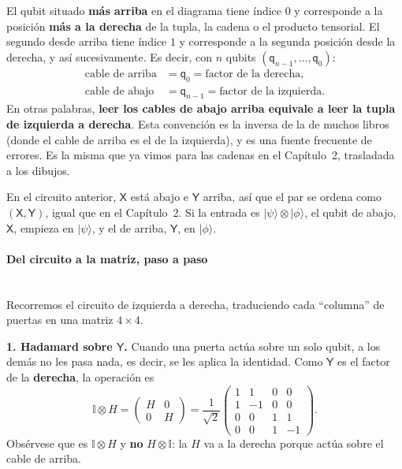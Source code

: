 \documentclass[11pt, a4paper, twoside, openright]{report}
\begin{document}
\begin{tcolorbox}[colback=teal!5!white,colframe=teal!75!black,title=\textbf{Convención de Qiskit para ordenar los qubits en un circuito}]
El qubit situado \textbf{más arriba} en el diagrama tiene índice $0$ y corresponde a la posición \textbf{más a la derecha} de la tupla, la cadena o el producto tensorial. El segundo desde arriba tiene índice $1$ y corresponde a la segunda posición desde la derecha, y así sucesivamente. Es decir, con $n$ qubits $(\mathsf{q}_{n-1},\dots,\mathsf{q}_0)$:
\begin{align*} \text{cable de arriba} &= \mathsf{q}_0 = \text{factor de la derecha}, \\ \text{cable de abajo} &= \mathsf{q}_{n-1} = \text{factor de la izquierda}. \end{align*}
En otras palabras, \textbf{leer los cables de abajo arriba equivale a leer la tupla de izquierda a derecha}. Esta convención es la inversa de la de muchos libros (donde el cable de arriba es el de la izquierda), y es una fuente frecuente de errores. Es la misma que ya vimos para las cadenas en el Capítulo~2, trasladada a los dibujos.
\end{tcolorbox}

\noindent En el circuito anterior, $\mathsf{X}$ está abajo e $\mathsf{Y}$ arriba, así que el par se ordena como $(\mathsf{X},\mathsf{Y})$, igual que en el Capítulo~2. Si la entrada es $|\psi\rangle\otimes|\phi\rangle$, el qubit de abajo, $\mathsf{X}$, empieza en $|\psi\rangle$, y el de arriba, $\mathsf{Y}$, en $|\phi\rangle$.

\paragraph{Del circuito a la matriz, paso a paso}\mbox{}\\

\noindent Recorremos el circuito de izquierda a derecha, traduciendo cada ``columna'' de puertas en una matriz $4\times4$.

\noindent \textbf{1. Hadamard sobre $\mathsf{Y}$.} Cuando una puerta actúa sobre un solo qubit, a los demás no les pasa nada, es decir, se les aplica la identidad. Como $\mathsf{Y}$ es el factor de la \textbf{derecha}, la operación es
\[
\mathbb{I}\otimes H = \begin{pmatrix} H & 0 \\ 0 & H\end{pmatrix} = \frac{1}{\sqrt2}\begin{pmatrix} 1&1&0&0\\1&-1&0&0\\0&0&1&1\\0&0&1&-1\end{pmatrix}.
\]
Obsérvese que es $\mathbb{I}\otimes H$ y \textbf{no} $H\otimes\mathbb{I}$: la $H$ va a la derecha porque actúa sobre el cable de arriba.
\end{document}
